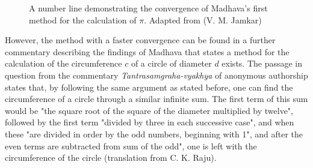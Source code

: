 \begin{figure}[H]


  \label{fig:numberline}
  \caption[]{A number line demonstrating the convergence of Madhava's first method for the
    calculation of $\pi$. Adapted from (V. M. Jamkar) \cite{jamkar_2018}}
\end{figure}


However, the method with a faster convergence can be found in a further commentary describing the findings of Madhava that states a method for the calculation of the circumference $c$ of a circle of diameter $d$ exists. The passage in question from the commentary \textit{Tantrasamgraha-vyakhya} of anonymous authorship states that, by following the same argument as stated before, one can find the circumference of a circle through a similar infinite sum. The first term of this sum would be "the square root of the square of the diameter multiplied by twelve", followed by the first term "divided by three in each successive case", and when these "are divided in order by the odd numbers, beginning with 1", and after the even terms are subtracted from sum of the odd", one is left with the circumference of the circle (translation from C. K. Raju). \cite{raju_2007}

